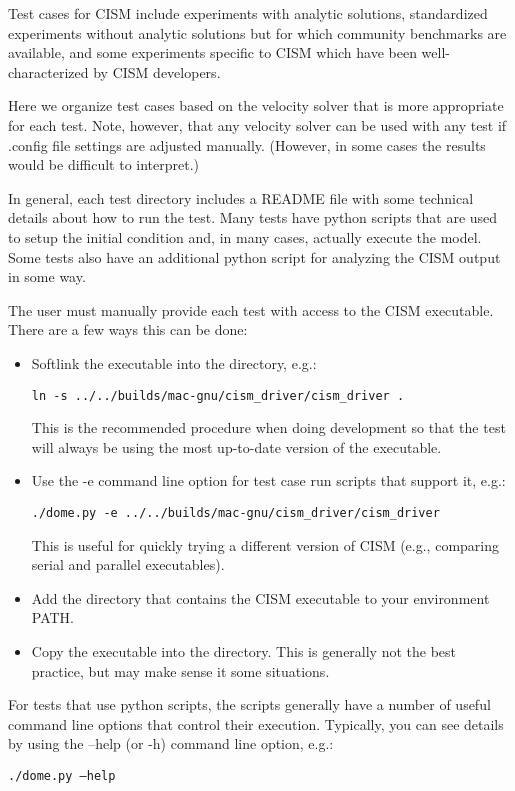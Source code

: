 Test cases for CISM include experiments with analytic solutions, standardized experiments
without analytic solutions but for which community benchmarks are available, and
some experiments specific to CISM which have been well-characterized by CISM developers.

Here we organize test cases based on the velocity solver that is more appropriate
for each test.  Note, however, that any velocity solver can be used with any test
if .config file settings are adjusted manually.  (However, in some cases the results
would be difficult to interpret.)

In general, each test directory includes a README file with some technical details 
about how to run the test.  Many tests have python scripts that are used to setup
the initial condition and, in many cases, actually execute the model.  Some tests
also have an additional python script for analyzing the CISM output in some way.

The user must manually provide each test with access to the CISM executable.
There are a few ways this can be done:

\begin{itemize}
  \item Softlink the executable into the directory, e.g.:

        \texttt{ln -s ../../builds/mac-gnu/cism\_driver/cism\_driver .}

        This is the recommended procedure when doing development so that the test
        will always be using the most up-to-date version of the executable.

  \item Use the -e command line option for test case run scripts that support it, e.g.:

        \texttt{./dome.py -e ../../builds/mac-gnu/cism\_driver/cism\_driver}

        This is useful for quickly trying a different version of CISM (e.g., comparing 
        serial and parallel executables).

  \item Add the directory that contains the CISM executable to your environment PATH.

  \item Copy the executable into the directory.  This is generally not the best practice,
        but may make sense it some situations.
\end{itemize}

For tests that use python scripts, the scripts generally have a number of useful
command line options that control their execution.  Typically, you can see details 
by using the --help (or -h) command line option, e.g.:

\texttt{./dome.py --help}







